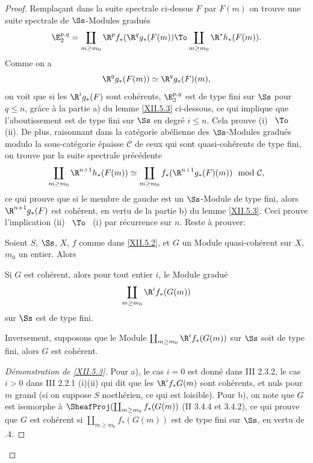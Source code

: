 \begin{proof}
Rempla\c cant dans la suite spectrale ci-dessus $F$ par $F(m)$ on
trouve une suite spectrale de $\Ss$-Modules gradu\'es
\[
\E_2^{p, q}= \coprod_{m\geq m_0} \R^pf_\ast(\R^qg_\ast(F(m)) \To \coprod_{m\geq m_0} \R^\ast h_\ast(F(m)).
\]
Comme on a
\[
\R^qg_\ast(F(m)) \simeq \R^qg_\ast(F) (m),
\]
on voit que si les $\R^ig_\ast(F)$ sont coh\'erents, $\E_2^{p, q}$ est de type fini sur $\Ss$ pour $q\leq n$, gr\^ace \`a la partie a) du lemme \ref{XII.5.3} ci-dessous, ce qui implique que l'aboutissement est de type fini sur $\Ss$ en degr\'e $i\leq n$. Cela prouve (i) ~$\To$~ (ii). De plus, raisonnant dans la cat\'egorie ab\'elienne des $\Ss$-Modules gradu\'es modulo la sous-cat\'egorie \'epaisse $\mathcal{C}$ de ceux qui sont quasi-coh\'erents de type fini, on trouve par la suite spectrale pr\'ec\'edente
\[
\coprod_{m\geq m_0} \R^{n+1} h_\ast(F(m)) \simeq \coprod_{m\geq m_0} f_\ast (\R^{n+1} g_\ast(F)(m)) \mod \mathcal{C},
\]
ce qui prouve que si le membre de gauche est un $\Ss$-Module de type fini, alors $\R^{n+1} g_\ast(F)$ est coh\'erent, en vertu de la partie b) du lemme \ref{XII.5.3}. Ceci prouve l'implication (ii) ~$\To$~ (i) par r\'ecurrence sur $n$. Reste \`a prouver:

\begin{lemme} \label{XII.5.3} Soient $S$, $\Ss$, $X$, $f$ comme dans \ref{XII.5.2}, et $G$ un Module quasi-coh\'erent sur $X$, $m_0$ un entier. Alors
\begin{enumeratea}
\item
Si $G$ est coh\'erent, alors pour tout entier $i$, le Module gradu\'e
\[
\coprod_{m\geq m_0} \R^i f_\ast(G(m))
\]
sur $\Ss$ est de type fini.
\item
Inversement, supposons que le Module $\coprod_{m\geq m_0} \R^i f_\ast(G(m))$ sur $\Ss$ soit de type fini, alors $G$ est coh\'erent.
\end{enumeratea}
\end{lemme}

\begin{proof}[D\'emonstration de \ref{XII.5.3}]
Pour a), le cas $i=0$ est donn\'e dans \EGA III 2.3.2, le cas $i>0$ dans \EGA III 2.2.1 (i)(ii) qui dit que les $ \R^i f_\ast G(m)$ sont coh\'erents, et nuls pour $m$ grand (si on suppose $S$ noeth\'erien, ce qui est loisible). Pour b), on note que $G$ est isomorphe \`a $\SheafProj (\coprod_{m\geq m_0}f_\ast(G(m))$ (\EGA II 3.4.4 et 3.4.2), ce qui prouve que $G$ est coh\'erent si $\coprod_{m\geq m_0}f_\ast(G(m))$ est de type fini sur $\Ss$, en vertu de .4.
\skipqed
\end{proof}
\skipqed
\end{proof}

